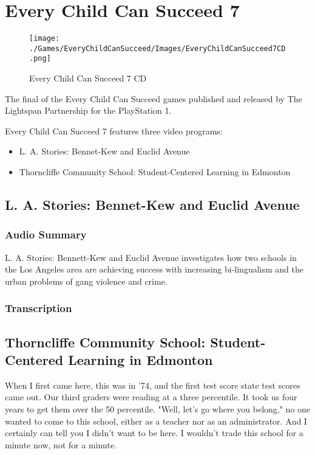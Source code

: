 \chapter{Every Child Can Succeed 7}

\begin{figure}[H]
    \centering
    \texttt{[image: ./Games/EveryChildCanSucceed/Images/EveryChildCanSucceed7CD.png]}
    \caption{Every Child Can Succeed 7 CD}
\end{figure}

The final of the Every Child Can Succeed games published and released by The Lightspan Partnership for the PlayStation 1.

Every Child Can Succeed 7 features three video programs:

\begin{itemize}
    \item L. A. Stories: Bennet-Kew and Euclid Avenue
    \item Thorncliffe Community School: Student-Centered Learning in Edmonton
\end{itemize}

\clearpage
\newpage

\section{L. A. Stories: Bennet-Kew and Euclid Avenue}

\subsection{Audio Summary}

L. A. Stories: Bennett-Kew and Euclid Avenue investigates how two schools in the Los Angeles area are achieving success with increasing bi-lingualism and the urban problems of gang violence and crime.

\subsection{Transcription}

\section{Thorncliffe Community School: Student-Centered Learning in Edmonton}

When I first came here, this was in '74, and the first test score state test scores came out. Our third graders were reading at a three percentile. It took us four years to get them over the 50 percentile. "Well, let's go where you belong," no one wanted to come to this school, either as a teacher nor as an administrator. And I certainly can tell you I didn't want to be here. I wouldn't trade this school for a minute now, not for a minute.

